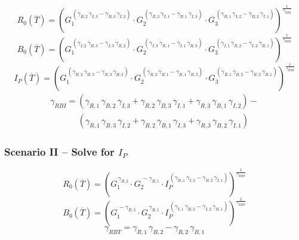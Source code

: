 \begin{equation}
	\label{eq:case_1_R}
	R_0( \overline T) = \left( 
	G_1 ^ {  \, ( \gamma_{B,2} \, \gamma_{I,3} - \gamma_{B,3} \, \gamma_{I,2} ) } \cdot 
	G_2 ^ {  \, ( \gamma_{B,3} \, \gamma_{I,1} - \gamma_{B,1} \, \gamma_{I,3} ) } \cdot 
	G_3 ^ {  \, ( \gamma_{B,1} \, \gamma_{I,2} - \gamma_{B,2} \, \gamma_{I,1} ) }\right)^{ \frac{1}{\gamma_{RBI}} }
\end{equation}
\begin{equation}
	\label{eq:case_1_B}
	B_0( \overline T) = \left( 
	G_1 ^ {  \, ( \gamma_{I,2} \, \gamma_{R,3} - \gamma_{I,3} \, \gamma_{R,2} ) } \cdot 
	G_2 ^ {  \, ( \gamma_{I,3} \, \gamma_{R,1} - \gamma_{I,1} \, \gamma_{R,3} ) } \cdot 
	G_3 ^ {  \, ( \gamma_{I,1} \, \gamma_{R,2} - \gamma_{I,2} \, \gamma_{R,1} ) }\right)^{ \frac{1}{\gamma_{RBI}} }
\end{equation}
\begin{equation}
	\label{eq:case_1_I}
	I_P( \overline T) = \left( 
	G_1 ^ {  \, ( \gamma_{R,2} \, \gamma_{B,3} - \gamma_{R,3} \, \gamma_{B,2} ) } \cdot 
	G_2 ^ {  \, ( \gamma_{R,3} \, \gamma_{B,1} - \gamma_{R,1} \, \gamma_{B,3} ) } \cdot 
	G_3 ^ {  \, ( \gamma_{R,1} \, \gamma_{B,2} - \gamma_{R,2} \, \gamma_{B,1} ) }\right)^{ \frac{1}{\gamma_{RBI}} }
\end{equation}
\begin{gather}
	\label{eq:case_1_gamma}
	\gamma_{RBI} = ( \gamma_{R,1} \, \gamma_{B,2} \, \gamma_{I,3} +  \gamma_{R,2} \, \gamma_{B,3} \, \gamma_{I,1} + \gamma_{R,3} \, \gamma_{B,1} \, \gamma_{I,2} ) - \\
	\ \ \ \ \ \ \ \ \ \ \ \ \ \ \ ( \gamma_{R,1} \, \gamma_{B,3} \, \gamma_{I,2} +  \gamma_{R,2} \, \gamma_{B,1} \, \gamma_{I,3} + \gamma_{R,3} \, \gamma_{B,2} \, \gamma_{I,1} ) \nonumber
\end{gather}

\subsubsection{Scenario II -- Solve for $I_P$}

\begin{equation}
	\label{eq:case_2_R}
	R_0( \overline T) = \left( 
	G_1 ^ {  \, \gamma_{B,2} } \cdot 
	G_2 ^ {  \, -\gamma_{B,1} } \cdot 
	I_P ^ {  \, ( \gamma_{B,1} \, \gamma_{I,2} - \gamma_{B,2} \, \gamma_{I,1} ) }\right)^{ \frac{1}{\gamma_{RBT}} }
\end{equation}
\begin{equation}
	\label{eq:case_2_B}
	B_0( \overline T) = \left( 
	G_1 ^ {  \, -\gamma_{R,2} } \cdot 
	G_2 ^ {  \, \gamma_{R,1} } \cdot 
	I_P ^ {  \, ( \gamma_{I,1} \, \gamma_{R,2} - \gamma_{I,2} \, \gamma_{R,1} ) }\right)^{ \frac{1}{\gamma_{RBT}} }
\end{equation}
\begin{equation}
	\label{eq:case_2_gamma}
	\gamma_{RBT} = \gamma_{R,1} \, \gamma_{B,2} - \gamma_{R,2} \, \gamma_{B,1}
\end{equation}

